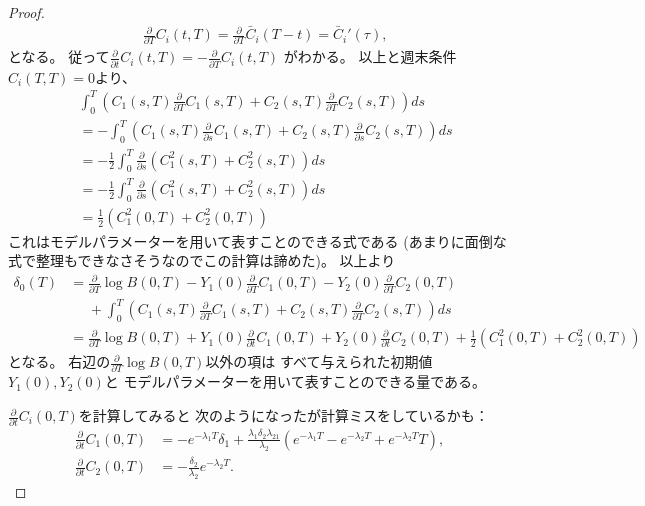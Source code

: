 \documentclass[uplatex]{jsarticle}
\theoremstyle{definition}
\begin{document}
\begin{proof}
\begin{align*}
    &\frac{\partial}{\partial T}C_i(t,T)
    = \frac{\partial}{\partial T}\bar{C}_i(T-t)
    = \bar{C}_i'(\tau),
  \end{align*}
  となる。
  従って\(\frac{\partial}{\partial t}C_i(t,T)
  = -\frac{\partial}{\partial T}C_i(t,T)\)
  がわかる。
  以上と週末条件\(C_i(T,T)=0\)より、
  \begin{align*}
    &\int_0^T \left( C_1(s,T)\frac{\partial}{\partial T} C_1(s,T)
    + C_2(s,T)\frac{\partial}{\partial T} C_2(s,T)\right) ds \\
    &= - \int_0^T \left( C_1(s,T)\frac{\partial}{\partial s} C_1(s,T)
    + C_2(s,T)\frac{\partial}{\partial s} C_2(s,T)\right) ds \\
    &= - \frac{1}{2}\int_0^T \frac{\partial}{\partial s}
    \left( C_1^2(s,T) + C_2^2(s,T)\right) ds \\
    &= - \frac{1}{2}\int_0^T \frac{\partial}{\partial s}
    \left( C_1^2(s,T) + C_2^2(s,T)\right) ds \\
    &= \frac{1}{2}
    \left( C_1^2(0,T) + C_2^2(0,T)\right)
  \end{align*}
  これはモデルパラメーターを用いて表すことのできる式である
  (あまりに面倒な式で整理もできなさそうなのでこの計算は諦めた)。
  以上より
  \begin{align*}
    \delta_0(T)
    &= \frac{\partial}{\partial T}\log B(0,T)
    - Y_1(0)\frac{\partial}{\partial T}C_1(0,T)
    - Y_2(0)\frac{\partial}{\partial T}C_2(0,T) \\
    &\ \ \ \ \ \
    + \int_0^T \left( C_1(s,T)\frac{\partial}{\partial T} C_1(s,T)
    + C_2(s,T)\frac{\partial}{\partial T} C_2(s,T)\right) ds \\
    &= \frac{\partial}{\partial T}\log B(0,T)
    + Y_1(0)\frac{\partial}{\partial t}C_1(0,T)
    + Y_2(0)\frac{\partial}{\partial t}C_2(0,T)
    + \frac{1}{2}\left( C_1^2(0,T) + C_2^2(0,T)\right)
  \end{align*}
  となる。
  右辺の\(\frac{\partial}{\partial T}\log B(0,T)\)以外の項は
  すべて与えられた初期値\(Y_1(0),Y_2(0)\)と
  モデルパラメーターを用いて表すことのできる量である。

  \(\frac{\partial}{\partial t}C_i(0,T)\)を計算してみると
  次のようになったが計算ミスをしているかも：
  \begin{align*}
    \frac{\partial}{\partial t}C_1(0,T)
    &= -e^{-\lambda_1T}\delta_1
    + \frac{\lambda_1\delta_2\lambda_{21}}{\lambda_2}
    \left( e^{-\lambda_1T}-e^{-\lambda_2T}+e^{-\lambda_2T}T\right), \\
    \frac{\partial}{\partial t}C_2(0,T)
    &= -\frac{\delta_2}{\lambda_2}e^{-\lambda_2T}.
  \end{align*}
\end{proof}
\end{document}

